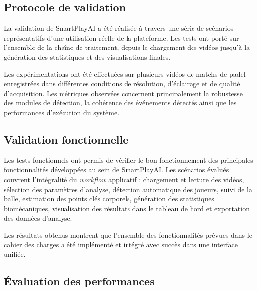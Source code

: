 \subsection{Protocole de validation}

La validation de SmartPlayAI a été réalisée à travers une série de scénarios
représentatifs d'une utilisation réelle de la plateforme. Les tests ont porté sur
l'ensemble de la chaîne de traitement, depuis le chargement des vidéos jusqu'à la
génération des statistiques et des visualisations finales.

Les expérimentations ont été effectuées sur plusieurs vidéos de matchs de padel
enregistrées dans différentes conditions de résolution, d'éclairage et de qualité
d'acquisition. Les métriques observées concernent principalement la robustesse des
modules de détection, la cohérence des événements détectés ainsi que les
performances d'exécution du système.

\subsection{Validation fonctionnelle}

Les tests fonctionnels ont permis de vérifier le bon fonctionnement des
principales fonctionnalités développées au sein de SmartPlayAI. Les scénarios
évalués couvrent l'intégralité du \textit{workflow} applicatif : chargement et
lecture des vidéos, sélection des paramètres d'analyse, détection automatique des
joueurs, suivi de la balle, estimation des points clés corporels, génération des
statistiques biomécaniques, visualisation des résultats dans le tableau de bord et
exportation des données d'analyse.

Les résultats obtenus montrent que l'ensemble des fonctionnalités prévues dans le
cahier des charges a été implémenté et intégré avec succès dans une interface
unifiée.

\subsection{Évaluation des performances}

